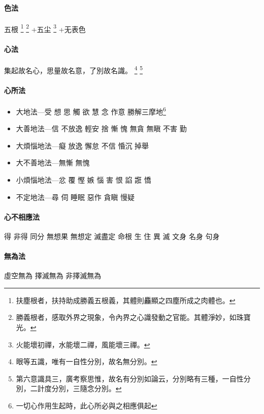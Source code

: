 \paragraph{色法}
五根
\footnote{扶塵根者，扶持助成勝義五根義，其體則麤顯之四塵所成之肉體也。}
\footnote{勝義根者，感取外界之現象，令內界之心識發動之官能。其體淨妙，如珠寶光。}
+五尘
\footnote{火能壞初禪，水能壞二禪，風能壞三禪。}
+无表色

\paragraph{心法}
集起故名心，思量故名意，了別故名識。
\footnote{眼等五識，唯有一自性分別，故名無分別。}
\footnote{第六意識具三，廣考察思惟，故名有分別如論云，分別略有三種，一自性分別，二計度分別，三隨念分別。}

\paragraph{心所法}
\begin{itemize}
  \item 大地法—受 想 思 觸 欲 慧 念 作意 勝解三摩地\footnote{一切心作用生起時，此心所必與之相應俱起}
  \item 大善地法—信 不放逸 輕安 捨 慚 愧 無貪 無瞋 不害 勤
  \item 大煩惱地法—癡 放逸 懈怠 不信 惛沉 掉舉
  \item 大不善地法—無慚 無愧
  \item 小煩惱地法—忿 覆 慳 嫉 惱 害 恨 諂 誑 憍
  \item 不定地法—尋 伺 睡眠 惡作 貪瞋 慢疑
\end{itemize}

\paragraph{心不相應法}
得 非得 同分 無想果 無想定 滅盡定 命根 生 住 異 滅 文身 名身 句身

\paragraph{無為法} 虛空無為 擇滅無為  非擇滅無為
